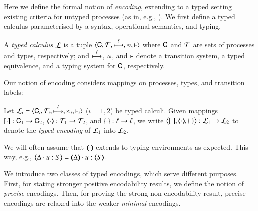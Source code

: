 \noi Here we define the formal notion of \emph{encoding}, 
extending to a typed setting existing criteria for untyped processes (as in, e.g.,
\cite{Nestmann00,Palamidessi03,DBLP:conf/lics/PalamidessiSVV06,DBLP:journals/iandc/Gorla10,DBLP:conf/icalp/LanesePSS10,DBLP:journals/tcs/FuL10}). 
We first define a typed calculus parameterised by a syntax, operational semantics, and typing.

\smallskip 

\begin{definition}\label{d:tcalculus}\rm
A \emph{typed calculus} $\mathcal{L}$ is a tuple
          $\calc{\CAL}{\cal{T}}{\hby{\ell}}{\wb}{\proves}$
	where $\mathsf{C}$ and $\cal{T}$ are sets of processes and types, 
respectively; and $\stackrel{\ell}{\longmapsto}$, $\approx$, and $\vdash$ 
	denote a transition system, a typed equivalence, and a typing system for $\mathsf{C}$, respectively. 
\end{definition}

\smallskip 

\noi 
Our notion of encoding considers mappings on processes, 
types, and transition labels: 

\begin{definition}\rm
\label{def:tenc}
        Let  $\tyl{L}_i=\calc{\CAL_i}{{\cal{T}}_i}{\hby{\ell}}{\wb_i}{\proves_i}$
        ($i=1,2$) be typed calculi. 
	Given mappings $[\!\![\cdot]\!\!]: \mathsf{C}_1 \to \mathsf{C}_2$, 
	$\mapt{\cdot}: {\cal{T}}_1 \to {\cal{T}}_2$, and 
	$\{\!\!\{\cdot\}\!\!\}: \ell \to \ell$, 
	we write 
	$\enco{\map{\cdot}, \mapt{\cdot}, \mapa{\cdot}} : \tyl{L}_1 \to \tyl{L}_2$ to denote the \emph{typed encoding} of $\mathcal{L}_1$ into $\mathcal{L}_2$.
\end{definition}

\smallskip 

\noi We will often assume that  $(\!\!\langle\cdot\rangle\!\!)$ extends to typing
environments as expected. This way, e.g., $\mapt{\Delta \cat u:S} = \mapt{\Delta} \cat u:\mapt{S}$.

We introduce two classes of typed encodings, which 
serve different purposes. 
First, for stating stronger positive encodability results, %
we define the notion of {\em precise} encodings.
Then, 
for proving the strong non-encodability result, %
precise encodings are relaxed into the weaker {\em minimal} encodings. 

